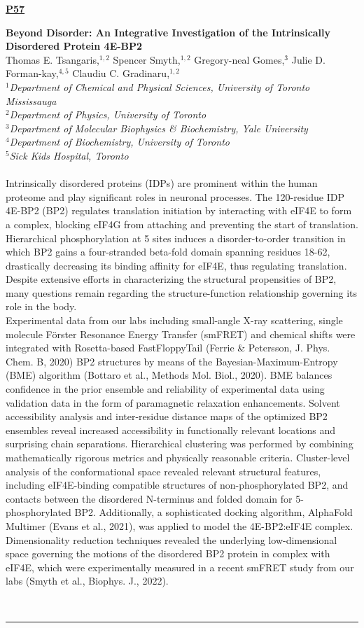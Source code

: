 \documentclass[titlepage,oneside,openany,10pt]{book}
\newenvironment{posterabs}[4] %
        {
	\begin{flushright}
                \underline{\textbf{#4}}
        \end{flushright}
        \textbf{#1}\\%
        #2\\%
        \textit{#3}\\\\%
        }
        {
        \\
        \noindent\rule{15cm}{0.5pt}%
        }
\begin{document}
\begin{posterabs}
	{Beyond Disorder: An Integrative Investigation of the Intrinsically Disordered Protein 4E-BP2}
	{Thomas E. Tsangaris,$^{1,2}$ Spencer Smyth,$^{1,2}$ Gregory-neal Gomes,$^{3}$ Julie D. Forman-kay,$^{4,5}$ Claudiu C. Gradinaru,$^{1,2}$}
	{
	$^1$Department of Chemical and Physical Sciences, University of Toronto Mississauga\\
	$^2$Department of Physics, University of Toronto\\
	$^3$Department of Molecular Biophysics \& Biochemistry, Yale University\\
	$^4$Department of Biochemistry, University of Toronto\\
	$^5$Sick Kids Hospital, Toronto
	}
	{P57}
	Intrinsically disordered proteins (IDPs) are prominent within the human proteome and play significant roles in neuronal processes. The 120-residue IDP 4E-BP2 (BP2) regulates translation initiation by interacting with eIF4E to form a complex, blocking eIF4G from attaching and preventing the start of translation. Hierarchical phosphorylation at 5 sites induces a disorder-to-order transition in which BP2 gains a four-stranded beta-fold domain spanning residues 18-62, drastically decreasing its binding affinity for eIF4E, thus regulating translation. Despite extensive efforts in characterizing the structural propensities of BP2, many questions remain regarding the structure-function relationship governing its role in the body.\\Experimental data from our labs including small-angle X-ray scattering, single molecule F\"{o}rster Resonance Energy Transfer (smFRET) and chemical shifts were integrated with Rosetta-based FastFloppyTail (Ferrie \& Petersson, J. Phys. Chem. B, 2020) BP2 structures by means of the Bayesian-Maximum-Entropy (BME) algorithm (Bottaro et al., Methods Mol. Biol., 2020). BME balances confidence in the prior ensemble and reliability of experimental data using validation data in the form of paramagnetic relaxation enhancements. Solvent accessibility analysis and inter-residue distance maps of the optimized BP2 ensembles reveal increased accessibility in functionally relevant locations and surprising chain separations. Hierarchical clustering was performed by combining mathematically rigorous metrics and physically reasonable criteria. Cluster-level analysis of the conformational space revealed relevant structural features, including eIF4E-binding compatible structures of non-phosphorylated BP2, and contacts between the disordered N-terminus and folded domain for 5-phosphorylated BP2. Additionally, a sophisticated docking algorithm, AlphaFold Multimer (Evans et al., 2021), was applied to model the 4E-BP2:eIF4E complex. Dimensionality reduction techniques revealed the underlying low-dimensional space governing the motions of the disordered BP2 protein in complex with eIF4E, which were experimentally measured in a recent smFRET study from our labs (Smyth et al., Biophys. J., 2022).
	\label{TsangarisT}
\end{posterabs}
\end{document}
